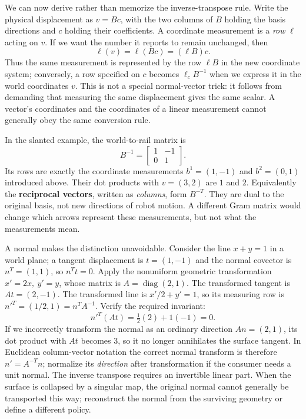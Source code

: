 We can now derive rather than memorize the inverse-transpose rule. Write the physical displacement as \(v=Bc\), with the two columns of \(B\) holding the basis directions and \(c\) holding their coefficients. A coordinate measurement is a \emph{row} \(\ell\) acting on \(v\). If we want the number it reports to remain unchanged, then \[
\ell(v)=\ell(Bc)=(\ell B)c.
\] Thus the same measurement is represented by the row \(\ell B\) in the new coordinate system; conversely, a row specified on \(c\) becomes \(\ell_c B^{-1}\) when we express it in the world coordinates \(v\). This is not a special normal-vector trick: it follows from demanding that measuring the same displacement gives the same scalar. A vector's coordinates and the coordinates of a linear measurement cannot generally obey the same conversion rule.

In the slanted example, the world-to-rail matrix is \[
B^{-1}=\begin{bmatrix}1&-1\\0&1\end{bmatrix}.
\] Its rows are exactly the coordinate measurements \(b^1=(1,-1)\) and \(b^2=(0,1)\) introduced above. Their dot products with \(v=(3,2)\) are \(1\) and \(2\). Equivalently the \textbf{reciprocal vectors}, written as \emph{columns}, form \(B^{-T}\). They are dual to the original basis, not new directions of robot motion. A different Gram matrix would change which arrows represent these measurements, but not what the measurements mean.

A normal makes the distinction unavoidable. Consider the line \(x+y=1\) in a world plane; a tangent displacement is \(t=(1,-1)\) and the normal covector is \(n^T=(1,1)\), so \(n^Tt=0\). Apply the nonuniform geometric transformation \(x'=2x,\ y'=y\), whose matrix is \(A=\operatorname{diag}(2,1)\). The transformed tangent is \(At=(2,-1)\). The transformed line is \(x'/2+y'=1\), so its measuring row is \(n'^T=(1/2,1)=n^TA^{-1}\). Verify the required invariant: \[
n'^T(At)=\tfrac12(2)+1(-1)=0.
\] If we incorrectly transform the normal as an ordinary direction \(An=(2,1)\), its dot product with \(At\) becomes \(3\), so it no longer annihilates the surface tangent. In Euclidean column-vector notation the correct normal transform is therefore \(n'=A^{-T}n\); normalize its \emph{direction} after transformation if the consumer needs a unit normal. The inverse transpose requires an invertible linear part. When the surface is collapsed by a singular map, the original normal cannot generally be transported this way; reconstruct the normal from the surviving geometry or define a different policy.


